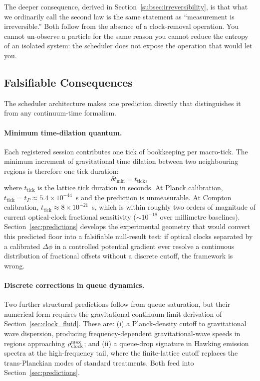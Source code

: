 The deeper consequence, derived in Section~\ref{subsec:irreversibility},
is that what we ordinarily call the second law is the same statement as
``measurement is irreversible.''
Both follow from the absence of a clock-removal operation.
You cannot un-observe a particle for the same reason you cannot reduce
the entropy of an isolated system: the scheduler does not expose the
operation that would let you.

\subsection{Falsifiable Consequences}
\label{subsec:scheduler_predictions}

The scheduler architecture makes one prediction directly that distinguishes
it from any continuum-time formalism.

\paragraph{Minimum time-dilation quantum.}
Each registered session contributes one tick of bookkeeping per
macro-tick.
The minimum increment of gravitational time dilation between two
neighbouring regions is therefore one tick duration:
\begin{equation}
    \delta t_\text{min} = t_\text{tick},
    \label{eq:min_dilation}
\end{equation}
where $t_\text{tick}$ is the lattice tick duration in seconds.
At Planck calibration, $t_\text{tick} = t_P \approx 5.4 \times 10^{-44}$~s
and the prediction is unmeasurable.
At Compton calibration, $t_\text{tick} \approx 8 \times 10^{-21}$~s,
which is within roughly two orders of magnitude of current optical-clock
fractional sensitivity ($\sim 10^{-18}$ over millimetre baselines).
Section~\ref{sec:predictions} develops the experimental geometry that
would convert this predicted floor into a falsifiable null-result test:
if optical clocks separated by a calibrated $\Delta\phi$ in a
controlled potential gradient ever resolve a continuous distribution of
fractional offsets without a discrete cutoff, the framework is wrong.

\paragraph{Discrete corrections in queue dynamics.}
Two further structural predictions follow from queue saturation, but
their numerical form requires the gravitational continuum-limit
derivation of Section~\ref{sec:clock_fluid}.
These are: (i) a Planck-density cutoff to gravitational wave dispersion,
producing frequency-dependent gravitational-wave speeds in regions
approaching $\rho_{\mathrm{clock}}^\text{max}$; and (ii) a queue-drop signature
in Hawking emission spectra at the high-frequency tail, where the
finite-lattice cutoff replaces the trans-Planckian modes of standard
treatments.
Both feed into Section~\ref{sec:predictions}.
